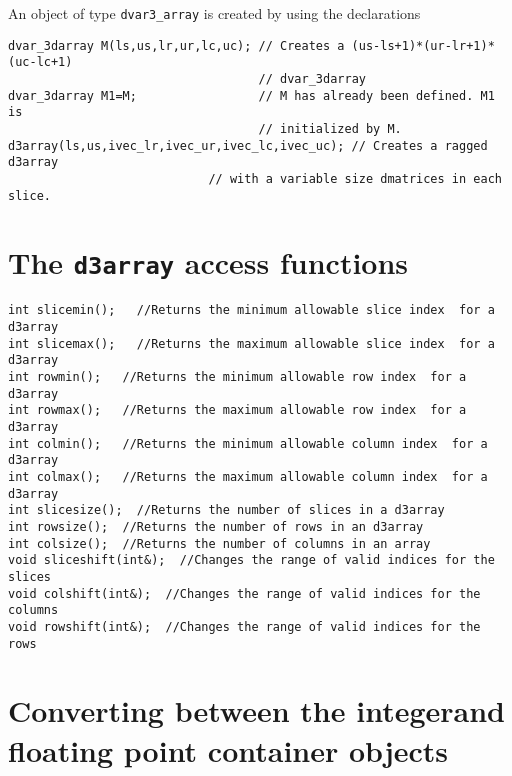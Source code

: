 \documentclass{admbmanual}
\begin{document}
An object of type \texttt{dvar3\_array} is created by using the declarations
\begin{lstlisting}
dvar_3darray M(ls,us,lr,ur,lc,uc); // Creates a (us-ls+1)*(ur-lr+1)*(uc-lc+1)
                                   // dvar_3darray
dvar_3darray M1=M;                 // M has already been defined. M1 is
                                   // initialized by M.
d3array(ls,us,ivec_lr,ivec_ur,ivec_lc,ivec_uc); // Creates a ragged d3array
                            // with a variable size dmatrices in each slice.
\end{lstlisting}

\section{The \texttt{d3array} access functions}

\begin{lstlisting}
int slicemin();   //Returns the minimum allowable slice index  for a d3array
int slicemax();   //Returns the maximum allowable slice index  for a d3array
int rowmin();   //Returns the minimum allowable row index  for a d3array
int rowmax();   //Returns the maximum allowable row index  for a d3array
int colmin();   //Returns the minimum allowable column index  for a d3array
int colmax();   //Returns the maximum allowable column index  for a d3array
int slicesize();  //Returns the number of slices in a d3array
int rowsize();  //Returns the number of rows in an d3array
int colsize();  //Returns the number of columns in an array
void sliceshift(int&);  //Changes the range of valid indices for the slices
void colshift(int&);  //Changes the range of valid indices for the columns
void rowshift(int&);  //Changes the range of valid indices for the rows
\end{lstlisting}

\section{Converting between the integer\br and floating point container objects}
\end{document}
